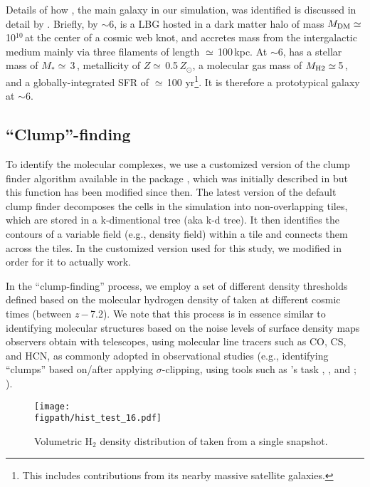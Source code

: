 \documentclass[apj]{emulateapj} %
\begin{document}
Details of how \flower, the main galaxy in our simulation,
was identified is discussed in detail by \citet{Pallottini17a}.
Briefly, by \z$\sim$6, \flower is a LBG hosted in 
a dark matter halo of mass $M_{\rm DM}\simeq$\,10$^{10}$\,\Msun at the center of a cosmic web knot, and 
accretes mass from the intergalactic medium mainly via three filaments of length $\simeq$\,100\,kpc.
At \z$\sim$6, \flower has a stellar mass of $M_*\simeq$\,3\,\Msun,
metallicity of $Z\simeq$\,0.5\,$Z_{\odot}$,
a molecular gas mass of $M_{\rm H2}\simeq$\,5\,\Msun,
and a globally-integrated SFR of $\simeq$\,100\,\Msun\,yr\pmOne\footnote{This includes contributions from its nearby massive satellite galaxies.}.
It is therefore a prototypical galaxy at \z$\sim$6.



\subsection{``Clump''-finding} \label{sec:method}

To identify the molecular complexes, we use a customized version of the clump finder algorithm 
available in the  package , which was initially described in \citet{Smith09a}
but this function has been modified since then.
The latest version of the default  clump finder decomposes the cells in the simulation
into non-overlapping tiles, which are stored in a k-dimentional tree (aka k-d tree).
It then identifies the contours of a variable field (e.g., density field) within a tile and connects them across 
the tiles. In the customized version used for this study, we modified  in order for it to actually work.

In the ``clump-finding'' process, we employ a set of different density thresholds defined based on the
molecular hydrogen density of \flower taken at different cosmic times (between $z$\,$-$\,7.2).
We note that this process is in essence similar to 
identifying molecular structures based on the noise levels of surface density maps 
observers obtain with telescopes, using molecular line tracers such as CO, CS, and HCN,
as commonly adopted in observational studies (e.g., identifying 
``clumps'' based on/after applying $\sigma$-clipping, 
using tools such as 's task , , 
and ; \citealt{Williams94a, Oka01a, Rosolowsky06a}).


\begin{figure}[Htbp]
\centering
\texttt{[image: \\figpath/hist\_test\_16.pdf]}  
\caption{
Volumetric H$_2$ density distribution of \flower taken from a single snapshot.
\label{fig:h2density}}
\end{figure}
\end{document}
